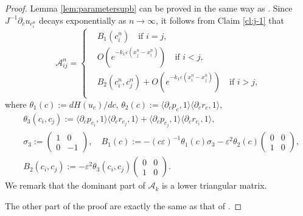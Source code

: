 \documentclass[11pt]{amsart}
\theoremstyle{remark}
\numberwithin{equation}{section}
\begin{document}
\begin{proof}
Lemma \ref{lem:parametersupb} can be proved in the same way as
\cite[Lemma 2.5]{Mi2}. Since $J^{-1}{\partial}_cu_{c_i^n}$ decays exponentially as
$n\to\infty$, it follows from Claim \ref{cl:j-1} that
\begin{equation}
\label{eq:Aij}
  \mathcal{A}_{ij}^n=\left\{\begin{aligned}
& B_1(c_i^n)\quad\text{if $i=j$,}\\
& O(e^{-k_1{\varepsilon}(x_j^n-x_i^n)})\quad\text{if $i<j$,}\\
& B_2(c_i^n,c_j^n)+O(e^{-k_1{\varepsilon}(x_i^n-x_j^n)})\quad\text{if $i>j$,}\\
\end{aligned}\right.
\end{equation}
where $\theta_1(c):=dH(u_c)/dc$, 
$\theta_2(c):={\langle} {\partial}_c p_{c},1{\rangle}{\langle} {\partial}_cr_{c},1{\rangle}$,
\begin{align*}
& \theta_3(c_i,c_j):={\langle} {\partial}_cp_{c_i},1{\rangle} {\langle} {\partial}_c r_{c_j},1{\rangle}
+{\langle} {\partial}_cp_{c_j},1{\rangle}{\langle} {\partial}_cr_{c_i},1{\rangle},\\
& \sigma_3:=\begin{pmatrix}1 & 0 \\ 0 & -1\end{pmatrix},
\quad B_1(c):=-(c{\varepsilon})^{-1}\theta_1(c)\sigma_3-{\varepsilon}^2\theta_2(c)
\begin{pmatrix}0 & 0\\ 1 & 0\end{pmatrix},
\\ & B_2(c_i,c_j):=-{\varepsilon}^2\theta_3(c_i,c_j)
\begin{pmatrix}0 & 0\\ 1 & 0\end{pmatrix}.
\end{align*}
We remark that the dominant part of $\mathcal{A}_k$ is a lower triangular
matrix.
\par
The other part of the proof are exactly the same as that of
\cite[Lemma 2.5]{Mi2}.
\end{proof}
\end{document}
